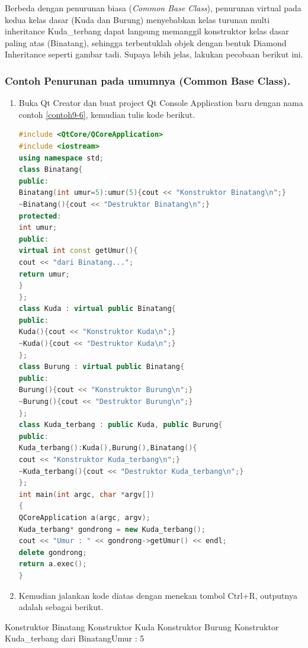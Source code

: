 Berbeda dengan penurunan biasa (\emph{Common Base Class}), penurunan
virtual pada kedua kelas dasar (Kuda dan Burung) menyebabkan kelas
turunan multi inheritance Kuda\_terbang dapat langsung memanggil
konstruktor kelas dasar paling atas (Binatang), sehingga terbentuklah
objek dengan bentuk Diamond Inheritance seperti gambar tadi. Supaya
lebih jelas, lakukan pecobaan berikut ini.

\subsubsection*{Contoh  Penurunan pada umumnya (Common Base Class).}

\begin{enumerate}

\item
  Buka Qt Creator dan buat project Qt Console Application baru dengan
  nama contoh \ref{contoh9-6}, kemudian tulis kode berikut.

\begin{lstlisting}[language=c++, caption= Penurunan pada umumnya (Common Base Class), label=contoh9-6]
#include <QtCore/QCoreApplication>
#include <iostream>
using namespace std;
class Binatang{
public:
Binatang(int umur=5):umur(5){cout << "Konstruktor Binatang\n";}
~Binatang(){cout << "Destruktor Binatang\n";}
protected:
int umur;
public:
virtual int const getUmur(){
cout << "dari Binatang...";
return umur;
}
};
class Kuda : virtual public Binatang{
public:
Kuda(){cout << "Konstruktor Kuda\n";}
~Kuda(){cout << "Destruktor Kuda\n";}
};
class Burung : virtual public Binatang{
public:
Burung(){cout << "Konstruktor Burung\n";}
~Burung(){cout << "Destruktor Burung\n";}
};
class Kuda_terbang : public Kuda, public Burung{
public:
Kuda_terbang():Kuda(),Burung(),Binatang(){
cout << "Konstruktor Kuda_terbang\n";}
~Kuda_terbang(){cout << "Destruktor Kuda_terbang\n";}
};
int main(int argc, char *argv[])
{
QCoreApplication a(argc, argv);
Kuda_terbang* gondrong = new Kuda_terbang();
cout << "Umur : " << gondrong->getUmur() << endl;
delete gondrong;
return a.exec();
}
\end{lstlisting}
\item
  Kemudian jalankan kode diatas dengan menekan tombol Ctrl+R, outputnya
  adalah sebagai berikut.
\end{enumerate}
\begin{lcverbatim}
Konstruktor Binatang
Konstruktor Kuda 
Konstruktor Burung
Konstruktor Kuda_terbang dari
BinatangUmur : 5
\end{lcverbatim}


